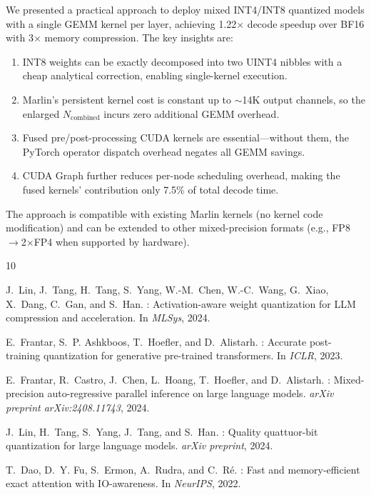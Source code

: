 \documentclass[11pt,a4paper]{article}
\begin{document}
We presented a practical approach to deploy mixed INT4/INT8 quantized models with a single GEMM kernel per layer, achieving 1.22$\times$ decode speedup over BF16 with 3$\times$ memory compression. The key insights are:
\begin{enumerate}
    \item INT8 weights can be exactly decomposed into two UINT4 nibbles with a cheap analytical correction, enabling single-kernel execution.
    \item Marlin's persistent kernel cost is constant up to $\sim$14K output channels, so the enlarged $N_{\text{combined}}$ incurs zero additional GEMM overhead.
    \item Fused pre/post-processing CUDA kernels are essential---without them, the PyTorch operator dispatch overhead negates all GEMM savings.
    \item CUDA Graph further reduces per-node scheduling overhead, making the fused kernels' contribution only 7.5\% of total decode time.
\end{enumerate}

The approach is compatible with existing Marlin kernels (no kernel code modification) and can be extended to other mixed-precision formats (e.g., FP8$\to$2$\times$FP4 when supported by hardware).



\begin{thebibliography}{10}

J.~Lin, J.~Tang, H.~Tang, S.~Yang, W.-M.~Chen, W.-C.~Wang, G.~Xiao, X.~Dang, C.~Gan, and S.~Han.
: Activation-aware weight quantization for {LLM} compression and acceleration.
\newblock In \emph{MLSys}, 2024.

E.~Frantar, S.~P. Ashkboos, T.~Hoefler, and D.~Alistarh.
: Accurate post-training quantization for generative pre-trained transformers.
\newblock In \emph{ICLR}, 2023.

E.~Frantar, R.~Castro, J.~Chen, L.~Hoang, T.~Hoefler, and D.~Alistarh.
: Mixed-precision auto-regressive parallel inference on large language models.
\newblock \emph{arXiv preprint arXiv:2408.11743}, 2024.

J.~Lin, H.~Tang, S.~Yang, J.~Tang, and S.~Han.
: Quality quattuor-bit quantization for large language models.
\newblock \emph{arXiv preprint}, 2024.

T.~Dao, D.~Y. Fu, S.~Ermon, A.~Rudra, and C.~R\'{e}.
: Fast and memory-efficient exact attention with {IO}-awareness.
\newblock In \emph{NeurIPS}, 2022.

\end{thebibliography}
\end{document}
